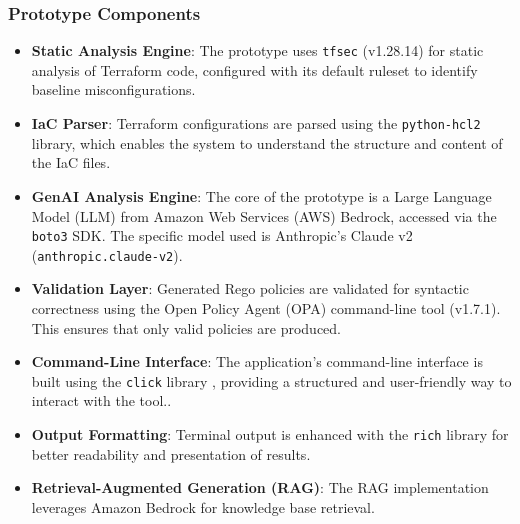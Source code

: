 
\subsubsection*{Prototype Components}
\begin{itemize}
    \item \textbf{Static Analysis Engine}: The prototype uses \texttt{tfsec} (v1.28.14) for static analysis of Terraform code, configured with its default ruleset to identify baseline misconfigurations.
    \item \textbf{IaC Parser}: Terraform configurations are parsed using the \texttt{python-hcl2} library, which enables the system to understand the structure and content of the IaC files.
    \item \textbf{GenAI Analysis Engine}: The core of the prototype is a Large Language Model (LLM) from Amazon Web Services (AWS) Bedrock, accessed via the \texttt{boto3} SDK. The specific model used is Anthropic's Claude v2 (\texttt{anthropic.claude-v2}).
    \item \textbf{Validation Layer}: Generated Rego policies are validated for syntactic correctness using the Open Policy Agent (OPA) command-line tool (v1.7.1). This ensures that only valid policies are produced.
    \item \textbf{Command-Line Interface}: The application's command-line interface is built using the \texttt{click} library \cite{ronacher_click_2024}, providing a structured and user-friendly way to interact with the tool..
    \item \textbf{Output Formatting}: Terminal output is enhanced with the \texttt{rich} library for better readability and presentation of results.
    \item \textbf{Retrieval-Augmented Generation (RAG)}: The RAG implementation leverages Amazon Bedrock for knowledge base retrieval. %
\end{itemize}


